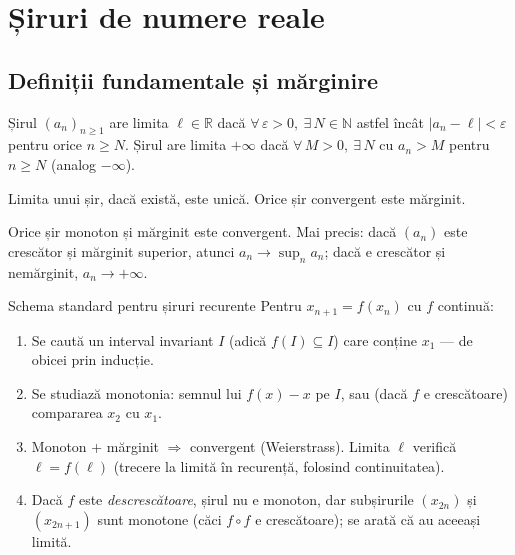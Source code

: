 \section{Șiruri de numere reale}

\subsection{Definiții fundamentale și mărginire}

\begin{definitie}
Șirul $(a_n)_{n\ge 1}$ are limita $\ell\in\mathbb{R}$ dacă
$\forall\, \varepsilon>0,\ \exists\, N\in\mathbb{N}$ astfel încât $|a_n-\ell|<\varepsilon$ pentru orice $n\ge N$. Șirul are limita $+\infty$ dacă $\forall\, M>0,\ \exists\, N$ cu $a_n>M$ pentru $n\ge N$ (analog $-\infty$).
\end{definitie}

\begin{teorema}
Limita unui șir, dacă există, este unică. Orice șir convergent este mărginit.
\end{teorema}

\begin{teorema}[Weierstrass]
Orice șir monoton și mărginit este convergent. Mai precis: dacă $(a_n)$ este crescător și mărginit superior, atunci $a_n \to \sup_n a_n$; dacă e crescător și nemărginit, $a_n\to+\infty$.
\end{teorema}

\begin{tehbox}{Schema standard pentru șiruri recurente}
Pentru $x_{n+1}=f(x_n)$ cu $f$ continuă:
\begin{enumerate}[leftmargin=*, itemsep=1pt]
\item Se caută un interval invariant $I$ (adică $f(I)\subseteq I$) care conține $x_1$ --- de obicei prin inducție.
\item Se studiază monotonia: semnul lui $f(x)-x$ pe $I$, sau (dacă $f$ e crescătoare) compararea $x_2$ cu $x_1$.
\item Monoton + mărginit $\Rightarrow$ convergent (Weierstrass). Limita $\ell$ verifică $\ell=f(\ell)$ (trecere la limită în recurență, folosind continuitatea).
\item Dacă $f$ este \emph{descrescătoare}, șirul nu e monoton, dar subșirurile $(x_{2n})$ și $(x_{2n+1})$ sunt monotone (căci $f\circ f$ e crescătoare); se arată că au aceeași limită.
\end{enumerate}
\end{tehbox}

